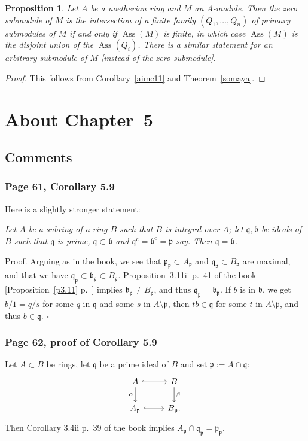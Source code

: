 \documentclass[12pt,letterpaper]{article}%
\newcommand{\oo}{\operatorname}\newcommand{\ooo}{\operatorname*}
\newcommand{\mf}{\mathfrak}
\newcommand{\bbb}{\mf b}
\newcommand{\ppp}{\mf p}
\newcommand{\qqq}{\mf q}
\newcommand{\Ass}{\oo{Ass}}
\newcommand{\nn}{\noindent}
\newtheorem{prop}[thm]{Proposition}
\begin{document}
\begin{prop}
Let $A$ be a noetherian ring and $M$ an $A$-module. Then the zero submodule of $M$ is the intersection of a finite family $(Q_1,\dots,Q_n)$ of primary submodules  of $M$ if and only if $\Ass(M)$ is finite, in which case $\Ass(M)$ is the disjoint union of the $\Ass(Q_i)$. There is a similar statement for an arbitrary submodule of $M$ [instead of the zero submodule].
\end{prop}
\begin{proof}
This follows from Corollary~\ref{aimc11} and Theorem~\ref{somaya}.
\end{proof}

\newpage

\section{About Chapter~5}%

\subsection{Comments}%

\subsubsection{Page 61, Corollary 5.9}\label{c5.9}%

Here is a slightly stronger statement: 

\nn\emph{Let $A$ be a subring of a ring $B$ such that $B$ is integral over $A$; let $\qqq,\bbb$ be ideals of $B$ such that $\qqq$ is prime, $\qqq\subset\bbb$ and $\qqq^{\oo c}=\bbb^{\oo c}=\ppp$ say. Then $\qqq=\bbb$.}

\nn Proof. Arguing as in the book, we see that $\ppp_\ppp\subset A_\ppp$ and $\qqq_\ppp\subset B_\ppp$ are maximal, and that we have $\qqq_\ppp\subset\bbb_\ppp\subset B_\ppp$. Proposition~3.11ii p.~41 of the book [Proposition~\ref{p3.11} p.~\pageref{p3.11}] implies $\bbb_\ppp\ne B_\ppp$, and thus $\qqq_\ppp=\bbb_\ppp$. If $b$ is in $\bbb$, we get $b/1=q/s$ for some $q$ in $\qqq$ and some $s$ in $A\setminus\ppp$, then $tb\in\qqq$ for some $t$ in $A\setminus\ppp$, and thus $b\in\qqq$. $\square$

\subsubsection{Page 62, proof of Corollary 5.9}%

Let $A\subset B$ be rings, let $\qqq$ be a prime ideal of $B$ and set $\ppp:=A\cap\qqq$:
$$
\begin{tikzcd}
A\ar[d,"\alpha"']\ar[r,hook]&B\ar[d,"\beta"]\\ 
A_\ppp\ar[r,hook]&B_\ppp.
\end{tikzcd}
$$
Then Corollary 3.4ii p.~39 of the book implies $A_\ppp\cap\qqq_\ppp=\ppp_\ppp$. 
\end{document}
